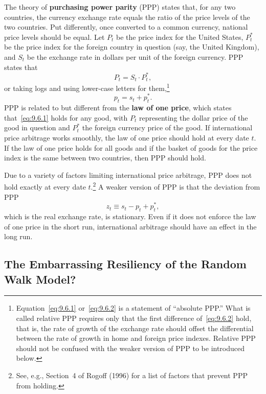 
The theory of \textbf{purchasing power parity} (PPP) states that, for any two countries,
the currency exchange rate equals the ratio of the price levels of the two countries.
Put differently, once converted to a common currency, national price levels should
be equal. Let $P_t$ be the price index for the United States, $P_t^*$ be the price index for
the foreign country in question (say, the United Kingdom), and $S_t$ be the exchange
rate in dollars per unit of the foreign currency. PPP states that
\begin{equation}
\label{eq:9.6.1}
P_t = S_t \cdot P_t^*,
\end{equation}
or taking logs and using lower-case letters for them,\footnote{Equation~\eqref{eq:9.6.1}
or~\eqref{eq:9.6.2} is a statement of ``absolute PPP.'' What is called relative PPP requires only that
the first difference of~\eqref{eq:9.6.2} hold, that is, the rate of growth of the exchange rate should offset the differential
between the rate of growth in home and foreign price indexes. Relative PPP should not be confused with the
weaker version of PPP to be introduced below.}
\begin{equation}
\label{eq:9.6.2}
p_t = s_t + p_t^*.
\end{equation}
PPP is related to but different from the \textbf{law of one price}, which states that~\eqref{eq:9.6.1}
holds for any good, with $P_t$ representing the dollar price of the good in question
and $P_t^*$ the foreign currency price of the good. If international price arbitrage
works smoothly, the law of one price should hold at every date $t$. If the law of one
price holds for all goods and if the basket of goods for the price index is the same
between two countries, then PPP should hold.

Due to a variety of factors limiting international price arbitrage, PPP does not
hold exactly at every date $t$.\footnote{See, e.g., Section~4 of Rogoff (1996) for a list of factors that prevent PPP from holding.} A weaker version of PPP is that the deviation
from PPP
\begin{equation}
\label{eq:9.6.3}
z_t \equiv s_t - p_t + p_t^*,
\end{equation}
which is the real exchange rate, is stationary. Even if it does not enforce the law
of one price in the short run, international arbitrage should have an effect in the
long run.

\subsection*{The Embarrassing Resiliency of the Random Walk Model?}

